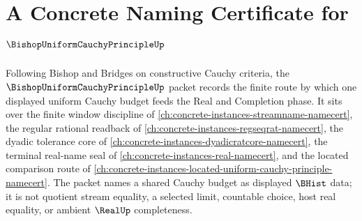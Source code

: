 \chapter{A Concrete Naming Certificate for $\BishopUniformCauchyPrincipleUp$}
\label{ch:concrete-instances-bishop-uniform-cauchy-principle-namecert}

Following Bishop and Bridges on constructive Cauchy criteria, the $\BishopUniformCauchyPrincipleUp$ packet records the finite route by which one displayed uniform Cauchy budget feeds the Real and Completion phase. It sits over the finite window discipline of \autoref{ch:concrete-instances-streamname-namecert}, the regular rational readback of \autoref{ch:concrete-instances-regseqrat-namecert}, the dyadic tolerance core of \autoref{ch:concrete-instances-dyadicratcore-namecert}, the terminal real-name seal of \autoref{ch:concrete-instances-real-namecert}, and the located comparison route of \autoref{ch:concrete-instances-located-uniform-cauchy-principle-namecert}. The packet names a shared Cauchy budget as displayed $\BHist$ data; it is not quotient stream equality, a selected limit, countable choice, host real equality, or ambient $\RealUp$ completeness.

